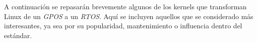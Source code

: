 
A continuación se repasarán brevemente algunos de los kernels que transforman Linux de un \textit{GPOS} a un \textit{RTOS}. Aquí se incluyen aquellos que se considerado más interesantes, ya sea por su popularidad, mantenimiento o influencia dentro del estándar.
